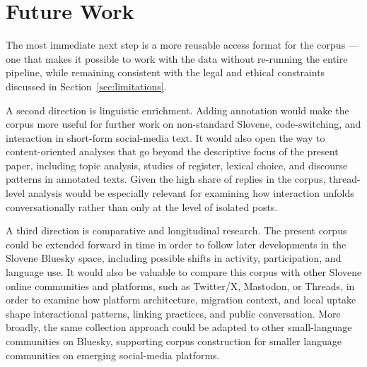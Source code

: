 \section{Future Work}\label{sec:future-work}

The most immediate next step is a more reusable access format for the corpus --- one that makes it possible to work with the data without re-running the entire pipeline, while remaining consistent with the legal and ethical constraints discussed in Section~\ref{sec:limitations}.

A second direction is linguistic enrichment. Adding annotation would make the corpus more useful for further work on non-standard Slovene, code-switching, and interaction in short-form social-media text. It would also open the way to content-oriented analyses that go beyond the descriptive focus of the present paper, including topic analysis, studies of register, lexical choice, and discourse patterns in annotated texts. Given the high share of replies in the corpus, thread-level analysis would be especially relevant for examining how interaction unfolds conversationally rather than only at the level of isolated posts.

A third direction is comparative and longitudinal research. The present corpus could be extended forward in time in order to follow later developments in the Slovene Bluesky space, including possible shifts in activity, participation, and language use. It would also be valuable to compare this corpus with other Slovene online communities and platforms, such as Twitter/X, Mastodon, or Threads, in order to examine how platform architecture, migration context, and local uptake shape interactional patterns, linking practices, and public conversation. More broadly, the same collection approach could be adapted to other small-language communities on Bluesky, supporting corpus construction for smaller language communities on emerging social-media platforms.
